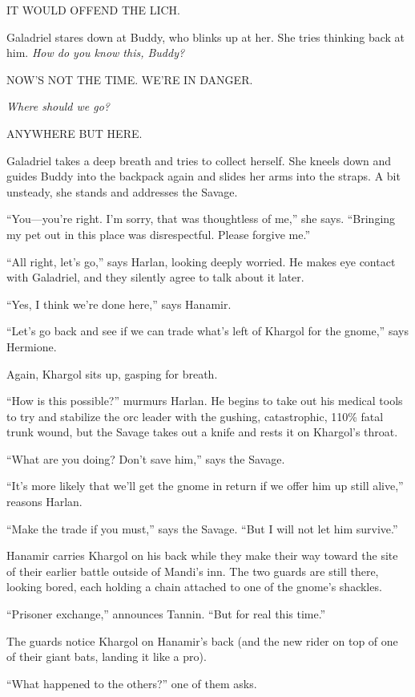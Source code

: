 \documentclass[smalldemyvopaper,11pt,twoside,onecolumn,openright,extrafontsizes]{memoir}
\begin{document}
IT WOULD OFFEND THE LICH.

Galadriel stares down at Buddy, who blinks up at her. She tries thinking
back at him. \emph{How do you know this, Buddy?}

NOW'S NOT THE TIME. WE'RE IN DANGER.

\emph{Where should we go?}

ANYWHERE BUT HERE.

Galadriel takes a deep breath and tries to collect herself. She kneels
down and guides Buddy into the backpack again and slides her arms into
the straps. A bit unsteady, she stands and addresses the Savage.

``You---you're right. I'm sorry, that was thoughtless of me,'' she says.
``Bringing my pet out in this place was disrespectful. Please forgive
me.''

``All right, let's go,'' says Harlan, looking deeply worried. He makes
eye contact with Galadriel, and they silently agree to talk about it
later.

``Yes, I think we're done here,'' says Hanamir.

``Let's go back and see if we can trade what's left of Khargol for the
gnome,'' says Hermione.

Again, Khargol sits up, gasping for breath.

``How is this possible?'' murmurs Harlan. He begins to take out his
medical tools to try and stabilize the orc leader with the gushing,
catastrophic, 110\% fatal trunk wound, but the Savage takes out a knife
and rests it on Khargol's throat.

``What are you doing? Don't save him,'' says the Savage.

``It's more likely that we'll get the gnome in return if we offer him up
still alive,'' reasons Harlan.

``Make the trade if you must,'' says the Savage. ``But I will not let
him survive.''

Hanamir carries Khargol on his back while they make their way toward the
site of their earlier battle outside of Mandi's inn. The two guards are
still there, looking bored, each holding a chain attached to one of the
gnome's shackles.

``Prisoner exchange,'' announces Tannin. ``But for real this time.''

The guards notice Khargol on Hanamir's back (and the new rider on top of
one of their giant bats, landing it like a pro).

``What happened to the others?'' one of them asks.
\end{document}
